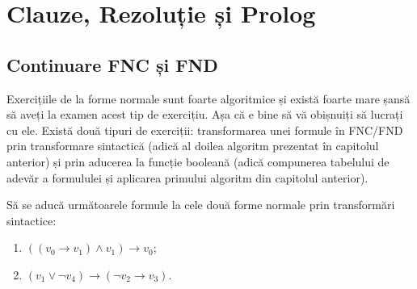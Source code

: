 \chapter{Clauze, Rezoluție și Prolog}

\section{Continuare FNC și FND}

Exercițiile de la forme normale sunt foarte algoritmice și există foarte mare șansă să aveți la examen acest tip de exercițiu. Așa că e bine să vă obișnuiți să lucrați cu ele. Există două tipuri de exerciții: transformarea unei formule în FNC/FND prin transformare sintactică (adică al doilea algoritm prezentat în capitolul anterior) și prin aducerea la funcție booleană (adică compunerea tabelului de adevăr a formululei și aplicarea primului algoritm din capitolul anterior).

\begin{ex}
Să se aducă următoarele formule la cele două forme normale prin transformări sintactice:
\begin{enumerate}
    \item[(i)] $((v_0 \rightarrow v_1) \land v_1) \rightarrow v_0$;
    \item[(ii)] $(v_1 \lor \neg v_4) \rightarrow (\neg v_2 \rightarrow v_3)$.
\end{enumerate}
\end{ex}

